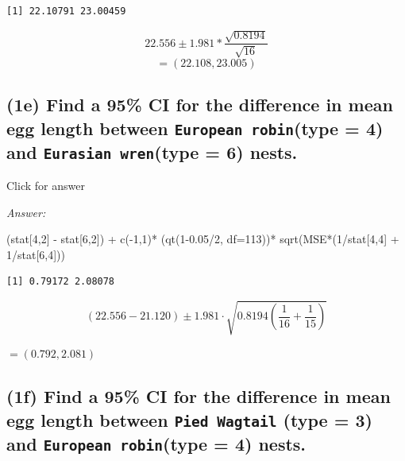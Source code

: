 \documentclass[
]{book}
\newenvironment{Shaded}{\begin{snugshade}}{\end{snugshade}}
\newcommand{\AttributeTok}[1]{\textcolor[rgb]{0.77,0.63,0.00}{#1}}
\newcommand{\DecValTok}[1]{\textcolor[rgb]{0.00,0.00,0.81}{#1}}
\newcommand{\FloatTok}[1]{\textcolor[rgb]{0.00,0.00,0.81}{#1}}
\newcommand{\FunctionTok}[1]{\textcolor[rgb]{0.00,0.00,0.00}{#1}}
\newcommand{\NormalTok}[1]{#1}
\newcommand{\SpecialCharTok}[1]{\textcolor[rgb]{0.00,0.00,0.00}{#1}}
\begin{document}
\begin{verbatim}
[1] 22.10791 23.00459
\end{verbatim}

\[22.556 \pm 1.981*\frac{\sqrt{0.8194}}{\sqrt{16}}\]
\[= (22.108, 23.005)\]

\hypertarget{e-find-a-95-ci-for-the-difference-in-mean-egg-length-between-european-robintype-4-and-eurasian-wrentype-6-nests.}{%
\subsection{\texorpdfstring{(1e) Find a 95\% CI for the difference in mean egg length between \texttt{European\ robin}(type = 4) and \texttt{Eurasian\ wren}(type = 6) nests.}{(1e) Find a 95\% CI for the difference in mean egg length between European robin(type = 4) and Eurasian wren(type = 6) nests.}}\label{e-find-a-95-ci-for-the-difference-in-mean-egg-length-between-european-robintype-4-and-eurasian-wrentype-6-nests.}}

Click for answer

\emph{Answer:}

\begin{Shaded}
\begin{Highlighting}[]
\NormalTok{(stat[}\DecValTok{4}\NormalTok{,}\DecValTok{2}\NormalTok{] }\SpecialCharTok{{-}}\NormalTok{ stat[}\DecValTok{6}\NormalTok{,}\DecValTok{2}\NormalTok{]) }\SpecialCharTok{+} \FunctionTok{c}\NormalTok{(}\SpecialCharTok{{-}}\DecValTok{1}\NormalTok{,}\DecValTok{1}\NormalTok{)}\SpecialCharTok{*}\NormalTok{ (}\FunctionTok{qt}\NormalTok{(}\DecValTok{1}\FloatTok{{-}0.05}\SpecialCharTok{/}\DecValTok{2}\NormalTok{, }\AttributeTok{df=}\DecValTok{113}\NormalTok{))}\SpecialCharTok{*} \FunctionTok{sqrt}\NormalTok{(MSE}\SpecialCharTok{*}\NormalTok{(}\DecValTok{1}\SpecialCharTok{/}\NormalTok{stat[}\DecValTok{4}\NormalTok{,}\DecValTok{4}\NormalTok{] }\SpecialCharTok{+} \DecValTok{1}\SpecialCharTok{/}\NormalTok{stat[}\DecValTok{6}\NormalTok{,}\DecValTok{4}\NormalTok{]))}
\end{Highlighting}
\end{Shaded}

\begin{verbatim}
[1] 0.79172 2.08078
\end{verbatim}

\[(22.556 - 21.120) \pm 1.981 \cdot \sqrt{0.8194\left(\frac{1}{16} + \frac{1}{15} \right)}\]

\(=(0.792, 2.081)\)

\hypertarget{f-find-a-95-ci-for-the-difference-in-mean-egg-length-between-pied-wagtail-type-3-and-european-robintype-4-nests.}{%
\subsection{\texorpdfstring{(1f) Find a 95\% CI for the difference in mean egg length between \texttt{Pied\ Wagtail} (type = 3) and \texttt{European\ robin}(type = 4) nests.}{(1f) Find a 95\% CI for the difference in mean egg length between Pied Wagtail (type = 3) and European robin(type = 4) nests.}}\label{f-find-a-95-ci-for-the-difference-in-mean-egg-length-between-pied-wagtail-type-3-and-european-robintype-4-nests.}}
\end{document}

